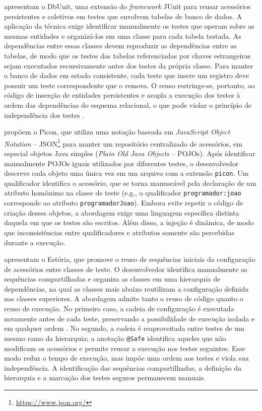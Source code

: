  apresentam o DbUnit, uma extensão do \textit{framework} JUnit para reusar acessórios persistentes e coletivos em testes que envolvem tabelas de banco de dados. A aplicação da técnica exige identificar manualmente os testes que operam sobre as mesmas entidades e organizá-los em uma classe para cada tabela testada. As dependências entre essas classes devem reproduzir as dependências entre as tabelas, de modo que os testes das tabelas referenciadas por chaves estrangeiras sejam executados recursivamente antes dos testes da própria classe. Para manter o banco de dados em estado consistente, cada teste que insere um registro deve possuir um teste correspondente que o remova. O reuso restringe-se, portanto, ao código de inserção de entidades persistentes e acopla a execução dos testes à ordem das dependências do esquema relacional, o que pode violar o princípio de independência dos testes \cite{meszaros:etal:2003}.

 propõem o Picon, que utiliza uma notação baseada em \textit{JavaScript Object Notation} -- JSON\footnote{\url{https://www.json.org/}} para manter um repositório centralizado de acessórios, em especial objetos Java simples (\textit{Plain Old Java Objects} -- POJOs). Após identificar manualmente POJOs iguais utilizados por diferentes testes, o desenvolvedor descreve cada objeto uma única vez em um arquivo com a extensão \texttt{picon}. Um qualificador identifica o acessório, que se torna manuseável pela declaração de um atributo homônimo na classe de teste (e.g., o qualificador \texttt{programador:joao} corresponde ao atributo \texttt{programadorJoao}). Embora evite repetir o código de criação desses objetos, a abordagem exige uma linguagem específica distinta daquela em que os testes são escritos. Além disso, a injeção é dinâmica, de modo que inconsistências entre qualificadores e atributos somente são percebidas durante a execução.

 apresentam o Estória, que promove o reuso de sequências iniciais da configuração de acessórios entre classes de teste. O desenvolvedor identifica manualmente as sequências compartilhadas e organiza as classes em uma hierarquia de dependências, na qual as classes mais abaixo reutilizam a configuração definida nas classes superiores. A abordagem admite tanto o reuso de código quanto o reuso de execução. No primeiro caso, a cadeia de configuração é executada novamente antes de cada teste, preservando a possibilidade de execução isolada e em qualquer ordem \cite{meszaros:etal:2003}. No segundo, a cadeia é reaproveitada entre testes de um mesmo ramo da hierarquia; a anotação \texttt{@Safe} identifica aqueles que não modificam os acessórios e permite reusar a execução nos testes seguintes. Esse modo reduz o tempo de execução, mas impõe uma ordem aos testes e viola sua independência. A identificação das sequências compartilhadas, a definição da hierarquia e a marcação dos testes seguros permanecem manuais.

